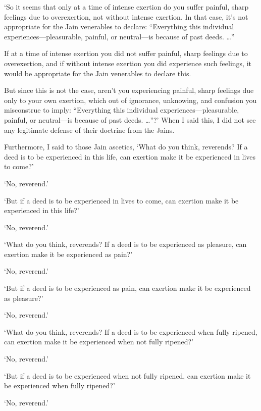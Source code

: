 \documentclass[12pt,openany]{book}%
\begin{document}
‘So it seems that only at a time of intense exertion do you suffer painful, sharp feelings due to overexertion, not without intense exertion. In that case, it’s not appropriate for the Jain venerables to declare: “Everything this individual experiences—pleasurable, painful, or neutral—is because of past deeds. …” 

If at a time of intense exertion you did not suffer painful, sharp feelings due to overexertion, and if without intense exertion you did experience such feelings, it would be appropriate for the Jain venerables to declare this. 

But since this is not the case, aren’t you experiencing painful, sharp feelings due only to your own exertion, which out of ignorance, unknowing, and confusion you misconstrue to imply: “Everything this individual experiences—pleasurable, painful, or neutral—is because of past deeds. …”?’ When I said this, I did not see any legitimate defense of their doctrine from the Jains. 

Furthermore, I said to those Jain ascetics, ‘What do you think, reverends? If a deed is to be experienced in this life, can exertion make it be experienced in lives to come?’ 

‘No, reverend.’ 

‘But if a deed is to be experienced in lives to come, can exertion make it be experienced in this life?’ 

‘No, reverend.’ 

‘What do you think, reverends? If a deed is to be experienced as pleasure, can exertion make it be experienced as pain?’ 

‘No, reverend.’ 

‘But if a deed is to be experienced as pain, can exertion make it be experienced as pleasure?’ 

‘No, reverend.’ 

‘What do you think, reverends? If a deed is to be experienced when fully ripened, can exertion make it be experienced when not fully ripened?’ 

‘No, reverend.’ 

‘But if a deed is to be experienced when not fully ripened, can exertion make it be experienced when fully ripened?’ 

‘No, reverend.’ 
\end{document}
